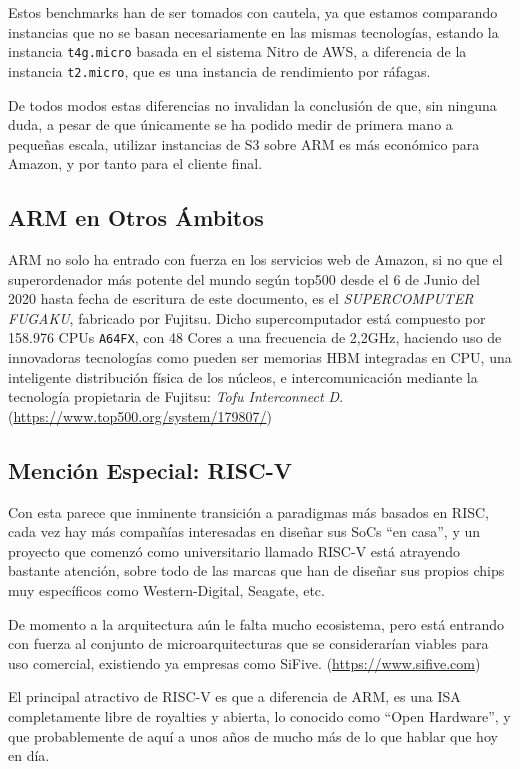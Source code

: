 \documentclass[a4paper,openright,12pt]{article}
\begin{document}
Estos benchmarks han de ser tomados con cautela, ya que estamos comparando instancias que no se basan necesariamente en las mismas tecnologías, estando la instancia \texttt{t4g.micro}
basada en el sistema Nitro de AWS, a diferencia de la instancia \texttt{t2.micro}, que es una instancia de rendimiento por ráfagas.

De todos modos estas diferencias no invalidan la conclusión de que, sin ninguna duda, a pesar de que únicamente se ha podido medir de primera mano a pequeñas escala, utilizar instancias de S3
sobre ARM es más económico para Amazon, y por tanto para el cliente final.

\subsection{ARM en Otros Ámbitos}
ARM no solo ha entrado con fuerza en los servicios web de Amazon, si no que el superordenador más potente del mundo según top500 desde el 6 de Junio del 2020 hasta fecha de escritura de este
documento, es el \emph{SUPERCOMPUTER FUGAKU}, fabricado por Fujitsu.
Dicho supercomputador está compuesto por 158.976 CPUs \texttt{A64FX}, con 48 Cores a una frecuencia de 2,2GHz, haciendo uso de innovadoras tecnologías como pueden ser memorias \gls{HBM} integradas en CPU,
una inteligente distribución física de los núcleos, e intercomunicación mediante la tecnología propietaria de Fujitsu: \emph{Tofu Interconnect D}. (\url{https://www.top500.org/system/179807/})

\subsection{Mención Especial: RISC-V}
Con esta parece que inminente transición a paradigmas más basados en RISC, cada vez hay más compañías interesadas en diseñar sus SoCs ``en casa'', y un proyecto que comenzó como universitario
llamado RISC-V está atrayendo bastante atención, sobre todo de las marcas que han de diseñar sus propios chips muy específicos como Western-Digital, Seagate, etc.

De momento a la arquitectura aún le falta mucho ecosistema, pero está entrando con fuerza al conjunto de microarquitecturas que se considerarían viables para uso comercial, existiendo ya
empresas como SiFive. (\url{https://www.sifive.com})

\bigskip

El principal atractivo de RISC-V es que a diferencia de ARM, es una ISA completamente libre de royalties y abierta, lo conocido como ``Open Hardware'', y que probablemente de aquí a unos
años de mucho más de lo que hablar que hoy en día.
\end{document}
